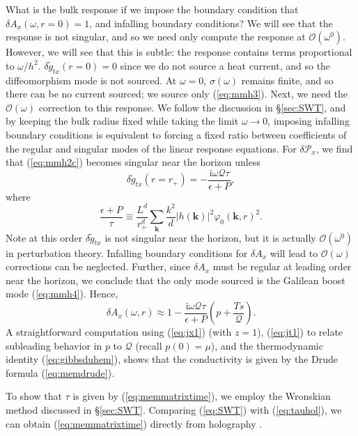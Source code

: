 \documentclass[10pt, oneside]{book}
\begin{document}
\begin{doublespace}
What is the bulk response if we impose the boundary condition that $\delta A_x(\omega,r=0) =1$, and infalling boundary conditions?   We will see that the response is not singular, and so we need only compute the response at  $\mathcal{O}(\omega^0)$.   However, we will see that this is subtle:  the response contains terms proportional to $\omega/h^2$.   $\delta \tilde{g}_{tx}(r=0)=0$ since we do not source a heat current, and so the diffeomorphism mode is not sourced.  At $\omega=0$, $\sigma(\omega)$ remains finite, and so there can be no current sourced; we source only (\ref{eq:mmh3}).   Next, we need the $\mathcal{O}(\omega)$ correction to this response.   We follow the discussion in \S\ref{sec:SWT}, and by keeping the bulk radius fixed while taking the limit $\omega \rightarrow 0$, imposing infalling boundary conditions is equivalent to forcing a fixed ratio between coefficients of the regular and singular modes of the linear response equations.   For $\delta\mathcal{P}_x$, we find that (\ref{eq:mmh2c}) becomes singular near the horizon unless \begin{equation}
\delta \tilde{g}_{tx}(r=r_+) = -\frac{\mathrm{i}\omega \mathcal{Q}\tau}{\epsilon+P},
\end{equation}
where \begin{equation}
\frac{\epsilon +P}{\tau} \equiv \frac{L^d}{r_+^d} \sum_{\mathbf{k}} \frac{k^2}{d}|h(\mathbf{k})|^2 \varphi_0(\mathbf{k},r)^2.  \label{eq:tauhol}
\end{equation}
Note at this order $\delta \tilde{g}_{tx}$ is not singular near the horizon, but it is actually $\mathcal{O}(\omega^0)$  in perturbation theory.   Infalling boundary conditions for $\delta A_x$ will lead to $\mathcal{O}(\omega)$ corrections can be neglected.  Further, since $\delta A_x$ must be regular at leading order near the horizon, we conclude that the only mode sourced is the Galilean boost mode (\ref{eq:mmh4}).   Hence, \begin{equation}
\delta A_x(\omega, r) \approx 1 -\frac{\mathrm{i}\omega \mathcal{Q}\tau}{\epsilon+P} \left(p+\frac{Ts}{\mathcal{Q}}\right).
\end{equation}
A straightforward computation using (\ref{eq:jx1}) (with $z=1$),  (\ref{eq:jt1}) to relate subleading behavior in $p$ to $\mathcal{Q}$ (recall $p(0)=\mu$), and the thermodynamic identity (\ref{eq:gibbsduhem}), shows that the conductivity is given by the Drude formula (\ref{eq:memdrude}).

To show that $\tau$ is given by (\ref{eq:memmatrixtime}), we employ the Wronskian method discussed in \S\ref{sec:SWT}.   Comparing (\ref{eq:SWT}) with (\ref{eq:tauhol}), we can obtain (\ref{eq:memmatrixtime}) directly from holography \cite{Lucas:2015vna}.


\end{doublespace}
\end{document}
